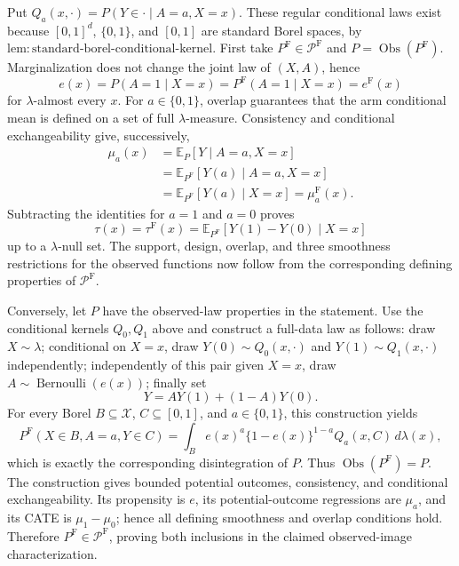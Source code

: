 Put \(Q_a(x,\cdot)=P(Y\in\cdot\mid A=a,X=x)\).  These regular conditional laws exist because \([0,1]^d\), \(\{0,1\}\), and \([0,1]\) are standard Borel spaces, by \(\mathrm{lem:standard\mbox{-}borel\mbox{-}conditional\mbox{-}kernel}\).  First take \(P^{\mathrm F}\in\mathcal P^{\mathrm F}\) and \(P=\operatorname{Obs}(P^{\mathrm F})\).  Marginalization does not change the joint law of \((X,A)\), hence
\[
 e(x)=P(A=1\mid X=x)=P^{\mathrm F}(A=1\mid X=x)=e^{\mathrm F}(x)
\]
for \(\lambda\)-almost every \(x\).  For \(a\in\{0,1\}\), overlap guarantees that the arm conditional mean is defined on a set of full \(\lambda\)-measure.  Consistency and conditional exchangeability give, successively,
\[
\begin{aligned}
 \mu_a(x)
 &=\mathbb E_P[Y\mid A=a,X=x]\\
 &=\mathbb E_{P^{\mathrm F}}[Y(a)\mid A=a,X=x]\\
 &=\mathbb E_{P^{\mathrm F}}[Y(a)\mid X=x]
 =\mu_a^{\mathrm F}(x).
\end{aligned}
\]
Subtracting the identities for \(a=1\) and \(a=0\) proves
\[
 \tau(x)=\tau^{\mathrm F}(x)
 =\mathbb E_{P^{\mathrm F}}[Y(1)-Y(0)\mid X=x]
\]
up to a \(\lambda\)-null set.  The support, design, overlap, and three smoothness restrictions for the observed functions now follow from the corresponding defining properties of \(\mathcal P^{\mathrm F}\).

Conversely, let \(P\) have the observed-law properties in the statement.  Use the conditional kernels \(Q_0,Q_1\) above and construct a full-data law as follows: draw \(X\sim\lambda\); conditional on \(X=x\), draw \(Y(0)\sim Q_0(x,\cdot)\) and \(Y(1)\sim Q_1(x,\cdot)\) independently; independently of this pair given \(X=x\), draw \(A\sim\operatorname{Bernoulli}(e(x))\); finally set
\[
 Y=A Y(1)+(1-A)Y(0).
\]
For every Borel \(B\subseteq\mathcal X\), \(C\subseteq[0,1]\), and \(a\in\{0,1\}\), this construction yields
\[
 P^{\mathrm F}(X\in B,A=a,Y\in C)
 =\int_B e(x)^a\{1-e(x)\}^{1-a}Q_a(x,C)\,d\lambda(x),
\]
which is exactly the corresponding disintegration of \(P\).  Thus \(\operatorname{Obs}(P^{\mathrm F})=P\).  The construction gives bounded potential outcomes, consistency, and conditional exchangeability.  Its propensity is \(e\), its potential-outcome regressions are \(\mu_a\), and its CATE is \(\mu_1-\mu_0\); hence all defining smoothness and overlap conditions hold.  Therefore \(P^{\mathrm F}\in\mathcal P^{\mathrm F}\), proving both inclusions in the claimed observed-image characterization.

